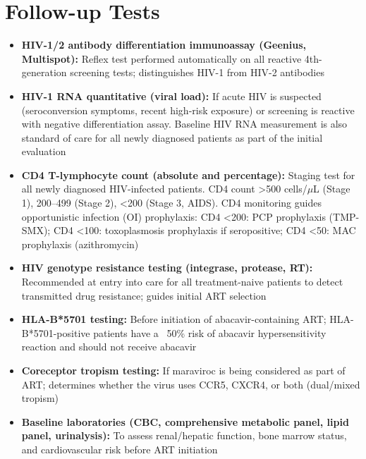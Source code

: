 \section*{Follow-up Tests}
\begin{itemize}
  \item \textbf{HIV-1/2 antibody differentiation immunoassay (Geenius, Multispot):} Reflex test performed automatically on all reactive 4th-generation screening tests; distinguishes HIV-1 from HIV-2 antibodies
  \item \textbf{HIV-1 RNA quantitative (viral load):} If acute HIV is suspected (seroconversion symptoms, recent high-risk exposure) or screening is reactive with negative differentiation assay. Baseline HIV RNA measurement is also standard of care for all newly diagnosed patients as part of the initial evaluation
  \item \textbf{CD4 T-lymphocyte count (absolute and percentage):} Staging test for all newly diagnosed HIV-infected patients. CD4 count >500 cells/$\mu$L (Stage 1), 200--499 (Stage 2), <200 (Stage 3, AIDS). CD4 monitoring guides opportunistic infection (OI) prophylaxis: CD4 <200: PCP prophylaxis (TMP-SMX); CD4 <100: toxoplasmosis prophylaxis if seropositive; CD4 <50: MAC prophylaxis (azithromycin)
  \item \textbf{HIV genotype resistance testing (integrase, protease, RT):} Recommended at entry into care for all treatment-naive patients to detect transmitted drug resistance; guides initial ART selection
  \item \textbf{HLA-B*5701 testing:} Before initiation of abacavir-containing ART; HLA-B*5701-positive patients have a ~50\% risk of abacavir hypersensitivity reaction and should not receive abacavir
  \item \textbf{Coreceptor tropism testing:} If maraviroc is being considered as part of ART; determines whether the virus uses CCR5, CXCR4, or both (dual/mixed tropism)
  \item \textbf{Baseline laboratories (CBC, comprehensive metabolic panel, lipid panel, urinalysis):} To assess renal/hepatic function, bone marrow status, and cardiovascular risk before ART initiation
\end{itemize}

